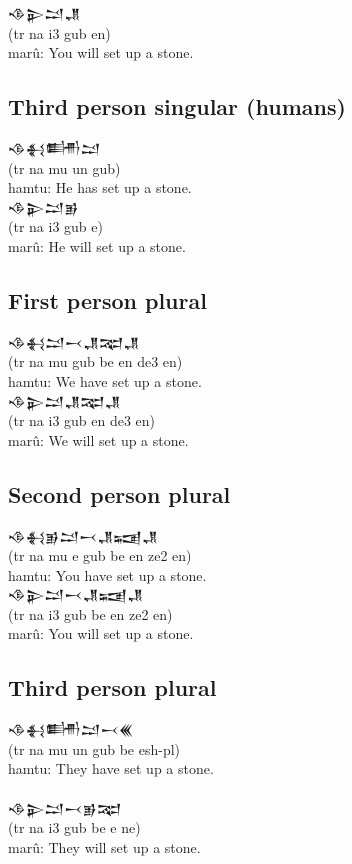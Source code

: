 \documentclass[a4paper,12pt]{book}
\newcommand{\fsm}{\Large\setmainfont{Akkadian.otf}}
\begin{document}
\noindent
{\fsm 𒈾𒉌𒁺𒂗}\\
(tr na i3 gub en)\\
marû: You will set up a stone.

\newpage
\subsection*{Third person singular (humans)}
{\fsm 𒈾𒈬𒌦𒁺}\\
(tr na mu un gub)\\
hamtu: He has set up a stone.\\

\noindent
{\fsm 𒈾𒉌𒁺𒂊}\\
(tr na i3 gub e)\\
marû: He will set up a stone.

\subsection*{First person plural}
{\fsm 𒈾𒈬𒁺𒁁𒂗𒉈𒂗}\\
(tr na mu gub be en de3 en)\\
hamtu: We have set up a stone.\\

\noindent
{\fsm 𒈾𒉌𒁺𒂗𒉈𒂗}\\
(tr na i3 gub en de3 en)\\
marû: We will set up a stone.

\subsection*{Second person plural}
{\fsm 𒈾𒈬𒂊𒁺𒁁𒂗𒍢𒂗}\\
(tr na mu e gub be en ze2 en)\\
hamtu: You have set up a stone.\\

\noindent
{\fsm 𒈾𒉌𒁺𒁁𒂗𒍢𒂗}\\
(tr na i3 gub be en ze2 en)\\
marû: You will set up a stone.

\newpage
\subsection*{Third person plural}
{\fsm 𒈾𒈬𒌦𒁺𒁁𒌍}\\
(tr na mu un gub be esh-pl)\\
hamtu: They have set up a stone.\\

\verb||\\
{\fsm 𒈾𒉌𒁺𒁁𒂊𒉈}\\
(tr na i3 gub be e ne)\\
marû: They will set up a stone.\\
\end{document}
